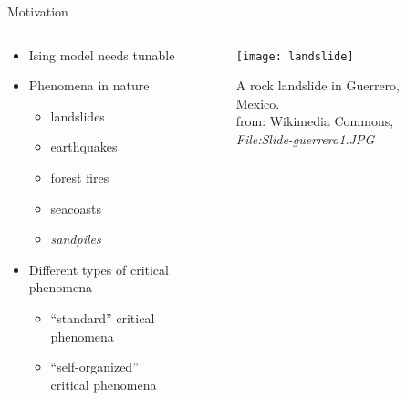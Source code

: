 \documentclass[xcolor=dvipsnames]{beamer}
\begin{document}
    \begin{frame}{Motivation}
        \begin{columns}[t]
            \begin{column}{0.6\linewidth}
                \begin{itemize}
                    \item Ising model needs tunable 
                    \item Phenomena in nature
                        \begin{itemize}
                            \item landslides
                            \item earthquakes
                            \item forest fires
                            \item seacoasts
                            \item \emph{sandpiles}
                        \end{itemize}
                \end{itemize}
                \begin{itemize}
                    \item Different types of critical phenomena
                        \begin{itemize}
                            \item \enquote{standard} critical phenomena
                            \item \enquote{self-organized} critical phenomena
                        \end{itemize}
                \end{itemize}
            \end{column}
            \begin{column}{0.4\linewidth}
                \begin{figure}[htb]
                    \centering
                    \texttt{[image: landslide]}
                    \caption{A rock landslide in Guerrero, Mexico.\\
                             \footnotesize from: Wikimedia Commons, \emph{File:Slide-guerrero1.JPG}}
                    \label{fig:}
                \end{figure}
            \end{column}
        \end{columns}
    \end{frame}
\end{document}
